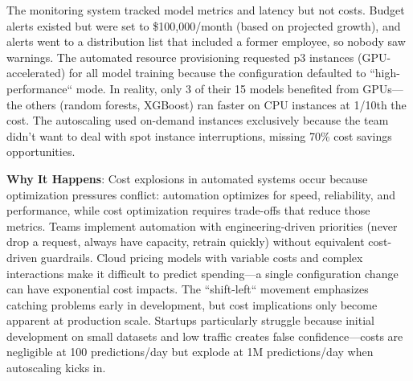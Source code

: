 The monitoring system tracked model metrics and latency but not costs. Budget alerts existed but were set to \$100,000/month (based on projected growth), and alerts went to a distribution list that included a former employee, so nobody saw warnings. The automated resource provisioning requested p3 instances (GPU-accelerated) for all model training because the configuration defaulted to ``high-performance`` mode. In reality, only 3 of their 15 models benefited from GPUs---the others (random forests, XGBoost) ran faster on CPU instances at 1/10th the cost. The autoscaling used on-demand instances exclusively because the team didn't want to deal with spot instance interruptions, missing 70\% cost savings opportunities.

\textbf{Why It Happens}: Cost explosions in automated systems occur because optimization pressures conflict: automation optimizes for speed, reliability, and performance, while cost optimization requires trade-offs that reduce those metrics. Teams implement automation with engineering-driven priorities (never drop a request, always have capacity, retrain quickly) without equivalent cost-driven guardrails. Cloud pricing models with variable costs and complex interactions make it difficult to predict spending---a single configuration change can have exponential cost impacts. The ``shift-left`` movement emphasizes catching problems early in development, but cost implications only become apparent at production scale. Startups particularly struggle because initial development on small datasets and low traffic creates false confidence---costs are negligible at 100 predictions/day but explode at 1M predictions/day when autoscaling kicks in.

